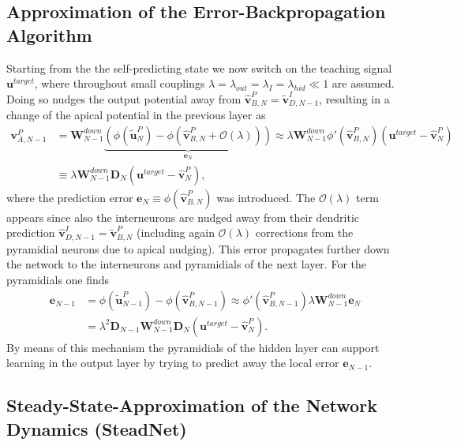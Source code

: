 \documentclass[12pt,a4paper]{article}
\begin{document}
\subsection{Approximation of the Error-Backpropagation Algorithm}
Starting from the the self-predicting state we now switch on the teaching signal $\bm{u}^{target}$, where throughout small couplings $\lambda = \lambda_{out} = \lambda_I = \lambda_{hid}\ll 1$ are assumed.\\
Doing so nudges the output potential away from $\hat{\bm{v}}^P_{B,N} = \tilde{\bm{v}}^I_{D,N-1}$, resulting in a change of the apical potential in the previous layer as
\begin{align}
\bm{v}^P_{A, N-1} &= \bm{W}^{down}_{N-1}\underbrace{\left(\phi(\tilde{\bm{u}}^P_N) - \phi(\hat{\bm{v}}^P_{B, N}  + \mathcal{O}(\lambda))\right)}_{\bm{e}_N} \approx \lambda\bm{W}^{down}_{N-1}\phi'(\hat{\bm{v}}^P_{B, N})\left(\bm{u}^{target} - \hat{\bm{v}}^P_{N}\right)\nonumber\\
&\equiv \lambda\bm{W}^{down}_{N-1}\bm{D}_N\left(\bm{u}^{target} - \hat{\bm{v}}^P_{N}\right),
\end{align}
where the prediction error $\bm{e}_N \equiv \phi(\hat{\bm{v}}^P_{B, N})$ was introduced. The $\mathcal{O}(\lambda)$ term appears since also the interneurons are nudged away from their dendritic prediction $\hat{\bm{v}}^I_{D,N-1} = \tilde{\bm{v}}^P_{B,N}$ (including again $\mathcal{O}(\lambda)$ corrections from the pyramidial neurons due to apical nudging). This error propagates further down the network to the interneurons and pyramidials of the next layer. For the pyramidials one finds
\begin{align}
\bm{e}_{N-1} &= \phi(\tilde{\bm{u}}^P_{N-1}) - \phi(\hat{\bm{v}}^P_{B,N-1}) \approx \phi'(\hat{\bm{v}}^P_{B,N-1}) \lambda \bm{W}^{down}_{N-1}\bm{e}_N\nonumber\\
&= \lambda^2 \bm{D}_{N-1}\bm{W}^{down}_{N-1}\bm{D}_N\left(\bm{u}^{target} - \hat{\bm{v}}^P_{N}\right).
\end{align}
By means of this mechanism the pyramidials of the hidden layer can support learning in the output layer by trying to predict away the local error $\bm{e}_{N-1}$.


\subsection{Steady-State-Approximation of the Network Dynamics (SteadNet)}
\label{chap:steadnet}
\end{document}
